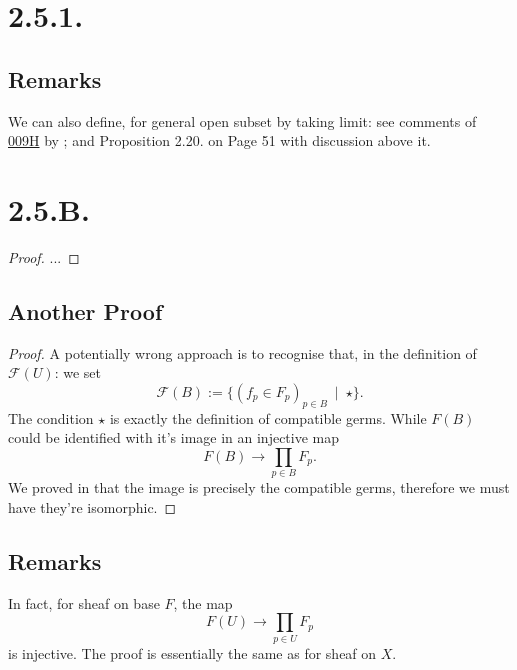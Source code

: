 \section{2.5.1.}

\subsection{Remarks}

We can also define, for general open subset by taking limit: see comments of \href{https://stacks.math.columbia.edu/tag/009H}{009H} by \cite{stacks-project}; and \cite{gortz2020algebraic} Proposition 2.20. on Page 51 with discussion above it.

\section{2.5.B.}

\begin{proof}
	...	
\end{proof}

\subsection{Another Proof}

\begin{proof}
A potentially wrong approach is to recognise that, in the definition of $\mathscr F(U)$: we set 
\[\mathscr F(B):=\{(f_p\in F_p)_{p\in B} ~\mid~ \star\}.\]
The condition $\star$ is exactly the definition of compatible germs. While $F(B)$ could be identified with it's image in an injective map
\[F(B)\to \prod_{p\in B}F_p.\]
We proved in  that the image is precisely the compatible germs, therefore we must have they're isomorphic.
\end{proof}

\subsection{Remarks}

In fact, for sheaf on base $F$, the map
\[F(U)\to\prod_{p\in U}F_p\] is injective. The proof is essentially the same as for sheaf on $X$.